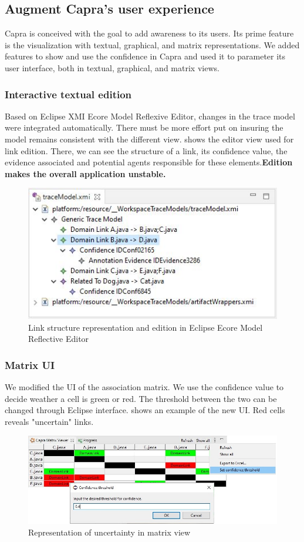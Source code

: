 \subsection{Augment Capra's user experience}
Capra is conceived with the goal to add awareness to its users. Its prime feature is the visualization with textual, graphical, and matrix representations. 
We added features to show and use the confidence in Capra and used it to parameter its user interface, both in textual, graphical, and matrix views. 

\subsubsection{Interactive textual edition}
Based on Eclipse XMI Ecore Model Reflexive Editor, changes in the trace model were integrated automatically. There must be more effort put on insuring the model remains consistent with the different view.  shows the editor view used for link edition. There, we can see the structure of a link, its confidence value, the evidence associated and potential agents responsible for these elements.\textbf{Edition makes the overall application unstable.}
\begin{figure}[h]  
	\centering
	\includegraphics[width=.55\linewidth]{images/textext.JPG}
	\caption{Link structure representation and edition in Eclipse Ecore Model Reflective Editor}
	\label{fig:textext}
\end{figure}





\subsubsection{Matrix UI}
We modified the UI of the association matrix. We use the confidence value to decide weather a cell is green or red. The threshold between the two can be changed through Eclipse interface.  shows an example of the new UI. Red cells reveals "uncertain" links.

\begin{figure}[h]  
	\centering
	\includegraphics[width=.90\linewidth]{images/matrixViewerExt.JPG}
	\caption{Representation of uncertainty in matrix view}
	\label{fig:matrixext}
\end{figure}

